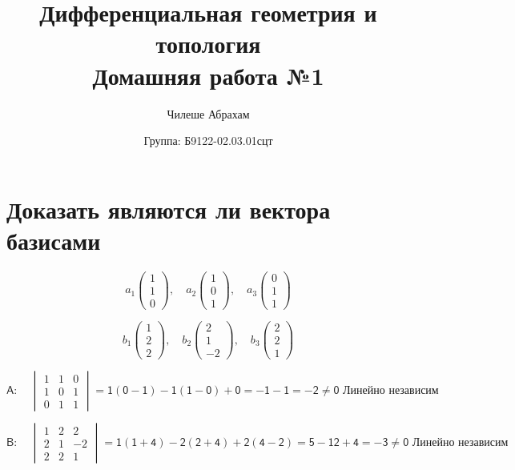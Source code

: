\documentclass{article}
\title{\vspace{-1cm}Дифференциальная геометрия и топология \\ Домашняя работа №1}
\author{Чилеше Абрахам}
\date{Группа: Б9122-02.03.01сцт}
\begin{document}
	
	\maketitle

	\section*{Доказать являются ли вектора базисами}

        \[
        a_1 \begin{pmatrix} 1 \\ 1 \\ 0 \end{pmatrix}, \quad a_2 \begin{pmatrix} 1 \\ 0 \\ 1 \end{pmatrix}, \quad a_3 \begin{pmatrix} 0 \\ 1 \\ 1 \end{pmatrix}
        \]
        
        \[
        b_1 \begin{pmatrix} 1 \\ 2 \\ 2 \end{pmatrix}, \quad b_2 \begin{pmatrix} 2 \\ 1 \\ -2 \end{pmatrix}, \quad b_3 \begin{pmatrix} 2 \\ 2 \\ 1 \end{pmatrix}
        \]
        \vspace{0.3cm}
            
        \[
        \mathsf{A:} \quad \begin{vmatrix} 
        1 & 1 & 0 \\
        1 & 0 & 1 \\
        0 & 1 & 1 
        \end{vmatrix} = \mathsf{1(0-1) - 1(1-0) + 0 = -1 - 1 = -2 \neq 0  \text{ Линейно независим}}
        \]
        
        \vspace{0.2cm}
        \[
        \mathsf{B:} \quad \begin{vmatrix}
        1 & 2 & 2 \\
        2 & 1 & -2 \\
        2 & 2 & 1
        \end{vmatrix} = \mathsf{1(1+4)-2(2+4)+2(4-2) = 5-12+4 = -3 \neq 0  \text{ Линейно независим}}
        \]
\end{document}
